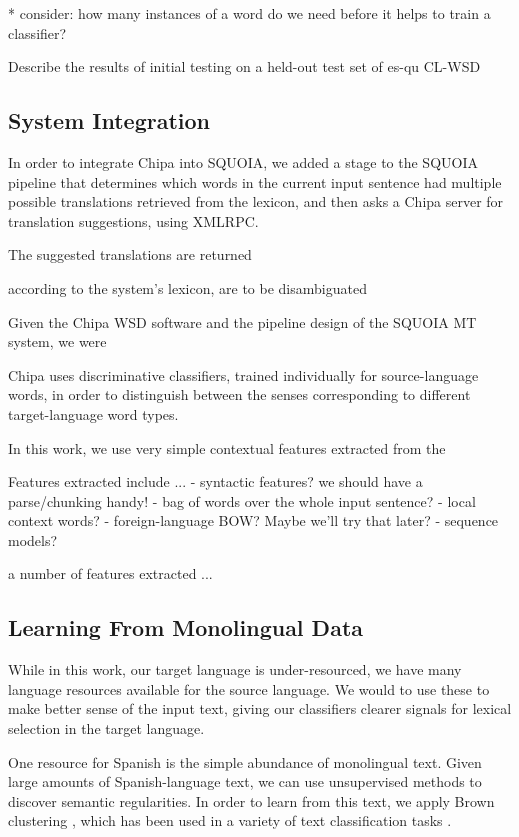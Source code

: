 \documentclass[10pt, a4paper]{article}
\begin{document}
* consider: how many instances of a word do we need before it helps to train a
classifier?

Describe the results of initial testing on a held-out test set of es-qu CL-WSD



\subsection{System Integration}
In order to integrate Chipa into SQUOIA, we added a stage to the SQUOIA
pipeline that determines which words in the current input sentence had multiple
possible translations retrieved from the lexicon, and then asks a Chipa
server for translation suggestions, using XMLRPC.

The suggested translations are returned 


according to the system's lexicon, 
are to be disambiguated 

Given the Chipa WSD software and the pipeline design of the SQUOIA MT system,
we were





Chipa uses discriminative classifiers, trained individually for source-language
words, in order to distinguish between the senses corresponding to different
target-language word types.

In this work, we use very simple contextual features extracted from the 

Features extracted include ...
- syntactic features? we should have a parse/chunking handy!
- bag of words over the whole input sentence?
- local context words?
- foreign-language BOW? Maybe we'll try that later?
- sequence models?

a number of features extracted ...

\subsection{Learning From Monolingual Data}
While in this work, our target language is under-resourced, we have many
language resources available for the source language. We would to use these to
make better sense of the input text, giving our classifiers clearer signals for
lexical selection in the target language.

One resource for Spanish is the simple abundance of monolingual text. Given
large amounts of Spanish-language text, we can use unsupervised methods to
discover semantic regularities. In order to learn from this text, we apply
Brown clustering \cite{Brown92class-basedn-gram}, which has been used in a
variety of text classification tasks \cite{turian-ratinov-bengio:2010:ACL}.
\end{document}
